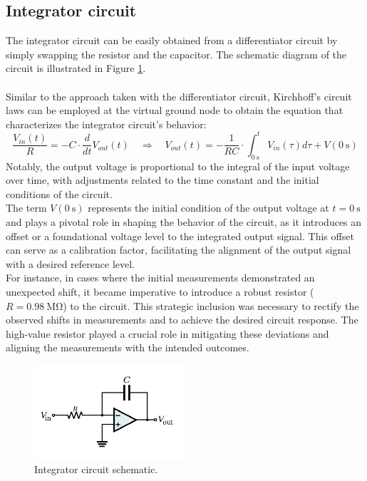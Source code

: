 	\subsection{Integrator circuit}
		The integrator circuit can be easily obtained from a differentiator circuit by simply swapping the resistor and the capacitor. 
		The schematic diagram of the circuit is illustrated in Figure \ref{fig:integrator_circuit}. \\\\
		Similar to the approach taken with the differentiator circuit, Kirchhoff's circuit laws can be employed at the virtual ground node to obtain the equation that characterizes the integrator circuit's behavior: $$ \frac{V_{in}(t)}{R} = - C \cdot \frac{d}{dt}V_{out}(t) \quad \Longrightarrow \quad V_{out}(t) = - \frac{1}{RC} \cdot \int_{\SI{0}{\second}}^t V_{in}(\tau)d\tau + V(\SI{0}{\second}) $$
		Notably, the output voltage is proportional to the integral of the input voltage over time, with adjustments related to the time constant and the initial conditions of the circuit. \\
		The term $V(\SI{0}{\second})$ represents the initial condition of the output voltage at $t=\SI{0}{\second}$ and plays a pivotal role in shaping the behavior of the circuit, as it introduces an offset or a foundational voltage level to the integrated output signal. 
		This offset can serve as a calibration factor, facilitating the alignment of the output signal with a desired reference level. \\
		For instance, in cases where the initial measurements demonstrated an unexpected shift, it became imperative to introduce a robust resistor ($R=\SI{0.98}{\mega\ohm}$) to the circuit. 
		This strategic inclusion was necessary to rectify the observed shifts in measurements and to achieve the desired circuit response. 
		The high-value resistor played a crucial role in mitigating these deviations and aligning the measurements with the intended outcomes.
		\begin{figure}[H]
		    \centering
		    \includegraphics[width=0.5\textwidth]{figures/integrator/circuit.png}
		    \caption{Integrator circuit schematic.}
		    \label{fig:integrator_circuit}
		\end{figure}
